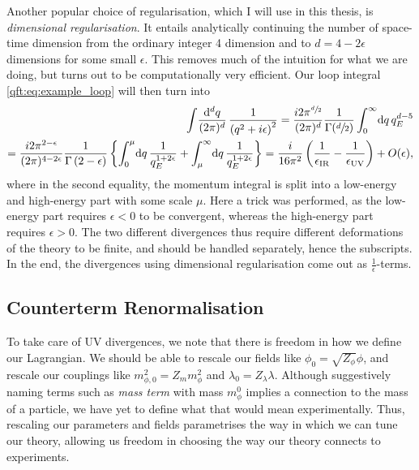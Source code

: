 \documentclass[../main.tex]{subfiles}
\begin{document}
Another popular choice of regularisation, which I will use in this thesis, is
\emph{dimensional regularisation}. It entails analytically continuing the
number of space-time dimension from the ordinary integer 4 dimension and to \(d
= 4-2\epsilon\) dimensions for some small \(\epsilon\). This removes much of
the intuition for what we are doing, but turns out to be computationally very
efficient. Our loop integral \cref{qft:eq:example_loop} will then turn into
\begin{align}
    \nonumber
    \loopintegral[d]{q} \frac{1}{\pclosed{q^2+i\epsilon}^2} = \frac{i 2\pi^{\sfrac{d}{2}}}{(2\pi)^d} \frac{1}{\Gamma(\sfrac{d}{2})} \integral[_0^\infty]{q} q_E^{d-5} \\
    = \frac{i 2\pi^{2-\epsilon}}{(2\pi)^{4-2\epsilon}} \frac{1}{\Gamma\pclosed{2-\epsilon}} \cclosed{ \integral[_0^\mu]{q} \frac{1}{q_E^{1+2\epsilon}} + \integral[_\mu^\infty]{q} \frac{1}{q_E^{1+2\epsilon}} } = \frac{i}{16\pi^2} \pclosed{\frac{1}{\epsilon_\text{IR}} - \frac{1}{\epsilon_\text{UV}}} + O(\epsilon),
\end{align}
where in the second equality, the momentum integral is split into a low-energy and high-energy part with some scale \(\mu\). Here a trick was performed, as the low-energy part requires \(\epsilon < 0\) to be convergent, whereas the high-energy part requires \(\epsilon>0\). The two different divergences thus require different deformations of the theory to be finite, and should be handled separately, hence the subscripts. In the end, the divergences using dimensional regularisation come out as \(\frac{1}{\epsilon}\)-terms.

\subsection{Counterterm Renormalisation}
To take care of UV divergences, we note that there is freedom in how we define
our Lagrangian. We should be able to rescale our fields like \(\phi_0 =
\sqrt{Z_\phi} \phi\), and rescale our couplings like \(m_{\phi,0}^2 = Z_m
m_\phi^2\) and \(\lambda_0 = Z_\lambda \lambda\). Although suggestively naming
terms such as \emph{mass term} with mass \(m_\phi^0\) implies a connection to
the mass of a particle, we have yet to define what that would mean
experimentally. Thus, rescaling our parameters and fields parametrises the way
in which we can tune our theory, allowing us freedom in choosing the way our
theory connects to experiments.
\end{document}
